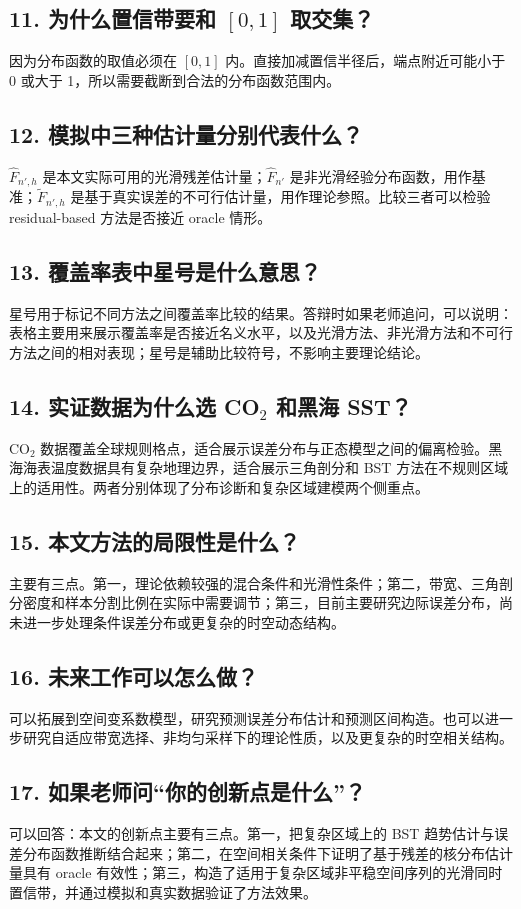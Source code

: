 \documentclass[UTF8,12pt]{ctexart}
\begin{document}
\subsection*{11. 为什么置信带要和 \([0,1]\) 取交集？}
因为分布函数的取值必须在 \([0,1]\) 内。直接加减置信半径后，端点附近可能小于 0 或大于 1，所以需要截断到合法的分布函数范围内。

\subsection*{12. 模拟中三种估计量分别代表什么？}
\(\hat F_{n',h}\) 是本文实际可用的光滑残差估计量；\(\hat F_{n'}\) 是非光滑经验分布函数，用作基准；\(\tilde F_{n',h}\) 是基于真实误差的不可行估计量，用作理论参照。比较三者可以检验 residual-based 方法是否接近 oracle 情形。

\subsection*{13. 覆盖率表中星号是什么意思？}
星号用于标记不同方法之间覆盖率比较的结果。答辩时如果老师追问，可以说明：表格主要用来展示覆盖率是否接近名义水平，以及光滑方法、非光滑方法和不可行方法之间的相对表现；星号是辅助比较符号，不影响主要理论结论。

\subsection*{14. 实证数据为什么选 CO\(_2\) 和黑海 SST？}
CO\(_2\) 数据覆盖全球规则格点，适合展示误差分布与正态模型之间的偏离检验。黑海海表温度数据具有复杂地理边界，适合展示三角剖分和 BST 方法在不规则区域上的适用性。两者分别体现了分布诊断和复杂区域建模两个侧重点。

\subsection*{15. 本文方法的局限性是什么？}
主要有三点。第一，理论依赖较强的混合条件和光滑性条件；第二，带宽、三角剖分密度和样本分割比例在实际中需要调节；第三，目前主要研究边际误差分布，尚未进一步处理条件误差分布或更复杂的时空动态结构。

\subsection*{16. 未来工作可以怎么做？}
可以拓展到空间变系数模型，研究预测误差分布估计和预测区间构造。也可以进一步研究自适应带宽选择、非均匀采样下的理论性质，以及更复杂的时空相关结构。

\subsection*{17. 如果老师问“你的创新点是什么”？}
可以回答：本文的创新点主要有三点。第一，把复杂区域上的 BST 趋势估计与误差分布函数推断结合起来；第二，在空间相关条件下证明了基于残差的核分布估计量具有 oracle 有效性；第三，构造了适用于复杂区域非平稳空间序列的光滑同时置信带，并通过模拟和真实数据验证了方法效果。
\end{document}

